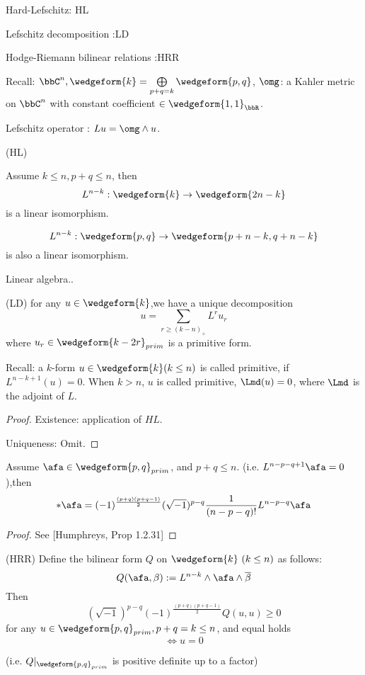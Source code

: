 Hard-Lefschitz: HL

Lefschitz decomposition :LD

Hodge-Riemann bilinear relations :HRR

Recall: $\bbC^n,\wedgeform{k}=\bigoplus\limits_{p+q=k}\wedgeform{p,q}$,
$\omg$: a Kahler metric on $\bbC^n$
with constant coefficient $\in\wedgeform{1,1}_\bbR$.

Lefschitz operator : $Lu=\omg\wedge u$.

\begin{thm}(HL)

Assume $k\leq n,p+q\leq n$, then
$$L^{n-k}:\wedgeform{k}\to \wedgeform{2n-k}$$
is a linear isomorphism.

$$L^{n-k}:\wedgeform{p,q}\to\wedgeform{p+n-k,q+n-k}$$
is also a linear isomorphism.
\end{thm}

Linear algebra..

\begin{thm}(LD)
for any $u\in\wedgeform{k}$,we have a unique decomposition
$$u=\sum_{r\geq(k-n)_+}L^ru_r$$
where $u_r\in\wedgeform{k-2r}_{prim}$ is a primitive form.
\end{thm}
Recall: a $k$-form $u\in\wedgeform{k}(k\leq n)$ is called primitive,
if $L^{n-k+1}(u)=0$. When $k>n$, $u$ is called primitive,
$\Lmd(u)=0$, where $\Lmd$ is the adjoint of $L$.

\begin{proof}

Existence: application of $HL$.

Uniqueness: Omit.
\end{proof}

\begin{prop} Assume $\afa\in\wedgeform{p,q}_{prim}$, and $p+q\leq n$.
(i.e. $L^{n-p-q+1}\afa=0$),then
$$
  *\afa
=
  (-1)^{\frac{(p+q)(p+q-1)}{2}}
  (\sqrt{-1})^{p-q}
  \frac{1}{(n-p-q)!}
  L^{n-p-q}\afa
$$
\end{prop}

\begin{proof}
  See [Humphreys, Prop 1.2.31]
\end{proof}

\begin{thm}(HRR)
Define the bilinear form $Q$ on $\wedgeform{k}\,\,(k\leq n)$ as follows:
$$Q(\afa,\beta):=L^{n-k}\wedge\afa\wedge\overline{\beta}$$
Then
$$(\sqrt{-1})^{p-q}(-1)^{\frac{(p+q)(p+q-1)}{2}}Q(u,u)\geq 0$$
for any $u\in \wedgeform{p,q}_{prim},p+q=k\leq n$,
and equal holds $$\iff u=0$$

(i.e. $Q|_{\wedgeform{p,q}_{prim}}$ is positive definite up to a factor)
\end{thm}


